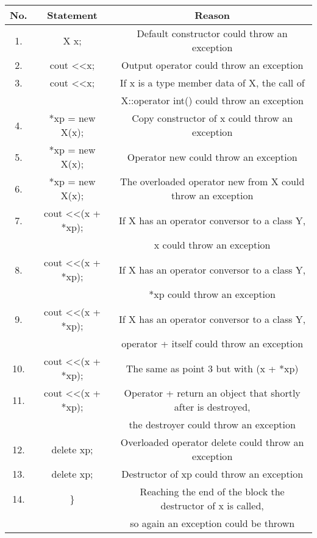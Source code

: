 \documentclass[11pt]{article}
\begin{document}
\begin{tabular}{|c|c|c|}
\hline
No. & Statement & Reason \\ \hline
1. & X x; & Default constructor could throw an exception \\ \hline
2. & cout \textless\textless x; & Output operator could throw an exception \\ \hline
3. & cout \textless\textless x; & If x is a type member data of X, the call of\\&&  X::operator int() could throw an exception\\ \hline
4. & *xp = new X(x); & Copy constructor of x could throw an exception \\ \hline
5. & *xp = new X(x); & Operator new could throw an exception \\ \hline
6. & *xp = new X(x); & The overloaded operator new from X could throw an exception \\ \hline
7. & cout \textless\textless (x + *xp); & If X has an operator conversor to a class Y,\\ &&x could throw an exception \\ \hline
8. & cout \textless\textless (x + *xp); & If X has an operator conversor to a class Y,\\ &&*xp could throw an exception \\ \hline
9. & cout \textless\textless (x + *xp); & If X has an operator conversor to a class Y,\\ &&operator + itself could throw an exception \\ \hline
10. & cout \textless\textless (x + *xp); & The same as point 3 but with (x + *xp)  \\ \hline
11. & cout \textless\textless (x + *xp); & Operator + return an object that shortly after is destroyed,\\ && the destroyer could throw an exception\\ \hline
12. & delete xp; & Overloaded operator delete could throw an exception \\ \hline
13. & delete xp; & Destructor of xp could throw an exception \\ \hline
14. & \} & Reaching the end of the block the destructor of x is called,\\ && so again an exception could be thrown \\ \hline
\end{tabular}
\end{document}
